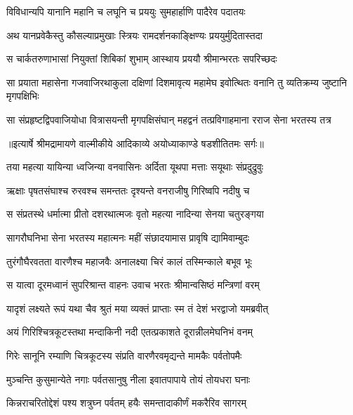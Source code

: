 \twolineshloka
{विविधान्यपि यानानि महानि च लघूनि च}
{प्रययुः सुमहार्हाणि पादैरेव पदातयः} %

\twolineshloka
{अथ यानप्रवेकैस्तु कौसल्याप्रमुखाः स्त्रियः}
{रामदर्शनकाङ्क्षिण्यः प्रययुर्मुदितास्तदा} %

\twolineshloka
{स चार्कतरुणाभासां नियुक्तां शिबिकां शुभाम्}
{आस्थाय प्रययौ श्रीमान्भरतः सपरिच्छदः} %

\threelineshloka
{सा प्रयाता महासेना गजवाजिरथाकुला}
{दक्षिणां दिशमावृत्य महामेघ इवोत्थितः}
{वनानि तु व्यतिक्रम्य जुष्टानि मृगपक्षिभिः} %

\fourlineindentedshloka
{सा संप्रहृष्टद्विपवाजियोधा}
{ वित्रासयन्ती मृगपक्षिसंघान्}
{महद्वनं तत्प्रविगाहमाना}
{ रराज सेना भरतस्य तत्र} %


{॥इत्यार्षे श्रीमद्रामायणे वाल्मीकीये आदिकाव्ये अयोध्याकाण्डे षडशीतितमः सर्गः॥}


\twolineshloka
{तया महत्या यायिन्या ध्वजिन्या वनवासिनः}
{अर्दिता यूथपा मत्ताः सयूथाः संप्रदुद्रुवुः} %

\twolineshloka
{ऋक्षाः पृषतसंघाश्च रुरवश्च समन्ततः}
{दृश्यन्ते वनराजीषु गिरिष्वपि नदीषु च} %

\twolineshloka
{स संप्रतस्थे धर्मात्मा प्रीतो दशरथात्मजः}
{वृतो महत्या नादिन्या सेनया चतुरङ्गया} %

\twolineshloka
{सागरौघनिभा सेना भरतस्य महात्मनः}
{महीं संछादयामास प्रावृषि द्यामिवाम्बुदः} %

\twolineshloka
{तुरंगौघैरवतता वारणैश्च महाजवैः}
{अनालक्ष्या चिरं कालं तस्मिन्काले बभूव भूः} %

\twolineshloka
{स यात्वा दूरमध्वानं सुपरिश्रान्त वाहनः}
{उवाच भरतः श्रीमान्वसिष्ठं मन्त्रिणां वरम्} %

\twolineshloka
{यादृशं लक्ष्यते रूपं यथा चैव श्रुतं मया}
{व्यक्तं प्राप्ताः स्म तं देशं भरद्वाजो यमब्रवीत्} %

\twolineshloka
{अयं गिरिश्चित्रकूटस्तथा मन्दाकिनी नदी}
{एतत्प्रकाशते दूरान्नीलमेघनिभं वनम्} %

\twolineshloka
{गिरेः सानूनि रम्याणि चित्रकूटस्य संप्रति}
{वारणैरवमृद्यन्ते मामकैः पर्वतोपमैः} %

\twolineshloka
{मुञ्चन्ति कुसुमान्येते नगाः पर्वतसानुषु}
{नीला इवातपापाये तोयं तोयधरा घनाः} %

\twolineshloka
{किन्नराचरितोद्देशं पश्य शत्रुघ्न पर्वतम्}
{हयैः समन्तादाकीर्णं मकरैरिव सागरम्} %

